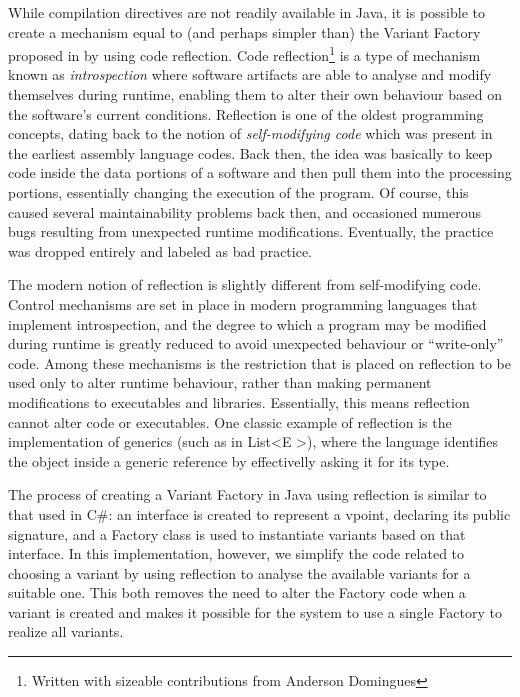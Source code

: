 While compilation directives are not readily available in Java, it is possible to create a mechanism equal to (and perhaps simpler than) the Variant Factory proposed in \cite{LASER:2015} by using code reflection. Code reflection\footnote{Written with sizeable contributions from Anderson Domingues} is a type of mechanism known as \emph{introspection} where software artifacts are able to analyse and modify themselves during runtime, enabling them to alter their own behaviour based on the software's current conditions. Reflection is one of the oldest programming concepts, dating back to the notion of \emph{self-modifying code} which was present in the earliest assembly language codes. Back then, the idea was basically to keep code inside the data portions of a software and then pull them into the processing portions, essentially changing the execution of the program. Of course, this caused several maintainability problems back then, and occasioned numerous bugs resulting from unexpected runtime modifications. Eventually, the practice was dropped entirely and labeled as bad practice.

The modern notion of reflection is slightly different from self-modifying code. Control mechanisms are set in place in modern programming languages that implement introspection, and the degree to which a program may be modified during runtime is greatly reduced to avoid unexpected behaviour or ``write-only'' code. Among these mechanisms is the restriction that is placed on reflection to be used only to alter runtime behaviour, rather than making permanent modifications to executables and libraries. Essentially, this means reflection cannot alter code or executables. One classic example of reflection is the implementation of generics (such as in List\textless E \textgreater), where the language identifies the object inside a generic reference by effectivelly asking it for its type.

 The process of creating a Variant Factory in Java using reflection is similar to that used in C\#: an interface is created to represent a \gls{vpoint}, declaring its public signature, and a Factory class is used to instantiate \gls{variant}s based on that interface. In this implementation, however, we simplify the code related to choosing a \gls{variant} by using reflection to analyse the available \gls{variant}s for a suitable one. This both removes the need to alter the Factory code when a \gls{variant} is created and makes it possible for the system to use a single Factory to realize all \gls{variant}s.

